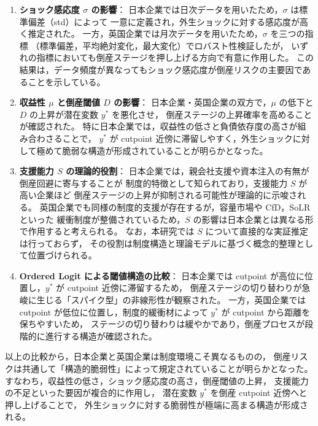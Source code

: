 \begin{enumerate}
    \item \textbf{ショック感応度 $\sigma$ の影響}：  
    日本企業では日次データを用いたため，$\sigma$ は標準偏差（std）によって
    一意に定義され，外生ショックに対する感応度が高く推定された。
    一方，英国企業では月次データを用いたため，$\sigma$ を三つの指標
    （標準偏差，平均絶対変化，最大変化）でロバスト性検証したが，
    いずれの指標においても倒産ステージを押し上げる方向で有意に作用した。
    この結果は，データ頻度が異なってもショック感応度が倒産リスクの主要因であることを示している。

    \item \textbf{収益性 $\mu$ と倒産閾値 $D$ の影響}：  
    日本企業・英国企業の双方で，$\mu$ の低下と $D$ の上昇が潜在変数 $y^*$ を悪化させ，
    倒産ステージの上昇確率を高めることが確認された。
    特に日本企業では，収益性の低さと負債依存度の高さが組み合わさることで，
    $y^*$ が cutpoint 近傍に滞留しやすく，外生ショックに対して極めて脆弱な構造が形成されていることが明らかとなった。

\item \textbf{支援能力 $S$ の理論的役割}：  
日本企業では，親会社支援や資本注入の有無が倒産回避に寄与することが
制度的特徴として知られており，支援能力 $S$ が高い企業ほど
倒産ステージの上昇が抑制される可能性が理論的に示唆される。
英国企業でも同様の制度的支援が存在するが，容量市場や CfD，SoLR といった
緩衝制度が整備されているため，$S$ の影響は日本企業とは異なる形で作用すると考えられる。
なお，本研究では $S$ について直接的な実証推定は行っておらず，
その役割は制度構造と理論モデルに基づく概念的整理として位置づけられる。


    \item \textbf{Ordered Logit による閾値構造の比較}：  
    日本企業では cutpoint が高位に位置し，$y^*$ が cutpoint 近傍に滞留するため，
    倒産ステージの切り替わりが急峻に生じる「スパイク型」の非線形性が観察された。
    一方，英国企業では cutpoint が低位に位置し，制度的緩衝材によって $y^*$ が cutpoint から距離を保ちやすいため，
    ステージの切り替わりは緩やかであり，倒産プロセスが段階的に進行する構造が確認された。
\end{enumerate}

以上の比較から，日本企業と英国企業は制度環境こそ異なるものの，
倒産リスクは共通して「構造的脆弱性」によって規定されていることが明らかとなった。
すなわち，収益性の低さ，ショック感応度の高さ，倒産閾値の上昇，
支援能力の不足といった要因が複合的に作用し，
潜在変数 $y^*$ を倒産 cutpoint 近傍へと押し上げることで，
外生ショックに対する脆弱性が極端に高まる構造が形成される。

